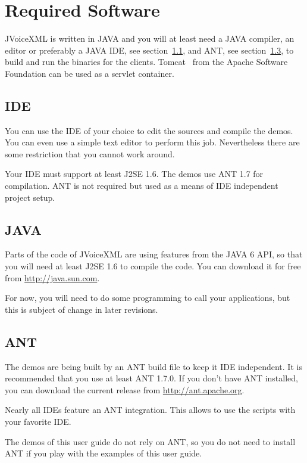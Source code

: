 \documentclass[11pt,a4paper]{book}
\begin{document}
\section{Required Software}
\label{sec:required-software}

JVoiceXML is written in JAVA and you will at least need a JAVA compiler, an 
editor or preferably a JAVA IDE, see section~\ref{sec:ide}, and ANT, see 
section~\ref{sec:ant}, to build and run the binaries for the 
clients. Tomcat~\cite{apache:tomcat} from the Apache Software Foundation can be
used as a servlet container.

\subsection{IDE}
\label{sec:ide}

You can use the IDE of your choice to edit the sources and compile the 
demos. You can even use a simple text editor to perform this job.
Nevertheless there are some restriction that you cannot work around.

Your IDE must support at least J2SE 1.6. The demos use ANT 1.7 for compilation. 
ANT is not required but used as a means of IDE independent project setup.

\subsection{JAVA}
\label{sec:java}

Parts of the code of JVoiceXML are using features from the JAVA 6 API, so that
you will need at least J2SE 1.6 to compile the code. You can download it
for free from \url{http://java.sun.com}.

For now, you will need to do some programming to call your applications, but
this is subject of change in later revisions.

\subsection{ANT}
\label{sec:ant}

The demos are being built by an ANT build file to keep it IDE independent. It is
recommended that you use at least ANT 1.7.0. 
If you don't have ANT installed, you can download the current release
from \url{http://ant.apache.org}.

Nearly all IDEs feature an ANT integration. This allows to use the scripts with
your favorite IDE.

The demos of this user guide do not rely on ANT, so you do not need to install
ANT if you play with the examples of this user guide.
\end{document}
